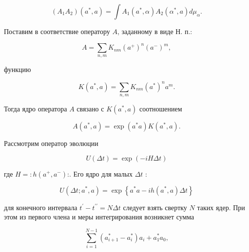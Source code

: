 \documentclass[10pt]{article}
\begin{document}
\[

\left(A_{1} A_{2}\right)\left(a^{*}, a\right)=\int A_{1}\left(a^{*}, \alpha\right) A_{2}\left(\alpha^{*}, a\right) d \mu_{\alpha} .

\]



Поставим в соответствие оператору $A$, заданному в виде Н. п.:



\[

A=\sum_{n, m} K_{n m}\left(a^{+}\right)^{n}\left(a^{-}\right)^{m},

\]



функцию



\[

K\left(a^{*}, a\right)=\sum_{n, m} K_{n m}\left(a^{*}\right)^{n} a^{m} .

\]



Тогда ядро оператора $A$ связано с $K\left(a^{*}, a\right)$ соотношением



\[

A\left(a^{*}, a\right)=\exp \left(a^{*} a\right) K\left(a^{*}, a\right) .

\]



Рассмотрим оператор эволюции



\[

U(\Delta t)=\exp (-i H \Delta t)

\]



где $H=: h\left(a^{+}, a^{-}\right)$:. Его ядро для малых $\Delta t$ :



\[

U\left(\Delta t ; a^{*}, a\right)=\exp \left\{a^{*} a-i h\left(a^{*}, a\right) \Delta t\right\}

\]



для конечного интервала $t^{\prime}-t^{\prime \prime}=N \Delta t$ следует взять свертку $N$ таких ядер. При этом из первого члена и меры интегрирования возникнет сумма



\[

\sum_{i=1}^{N-1}\left(a_{i+1}^{*}-a_{i}^{*}\right) a_{i}+a_{1}^{*} a_{0},

\]
\end{document}
